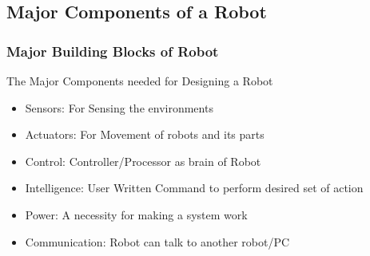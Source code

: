 \documentclass[10pt,red]{beamer}
\begin{document}
\subsection{Major Components of a Robot}
\begin{frame}
	\frametitle{Major Building Blocks of Robot} 
	The Major Components needed for Designing a Robot  
	\begin{itemize}
		\item <1-> Sensors: For Sensing the environments \\[5pt]
		\item <1-> Actuators: For Movement of robots and its parts \\[5pt]
		\item <1-> Control: Controller/Processor as brain of Robot \\[5pt]
		\item <1-> Intelligence: User Written Command to perform desired set of action \\[5pt]    
		\item <1-> Power: A necessity for making a system work \\[5pt]
		\item <1-> Communication: Robot can talk to another robot/PC \\[5pt]
	\end{itemize}
\end{frame}

\end{document}
